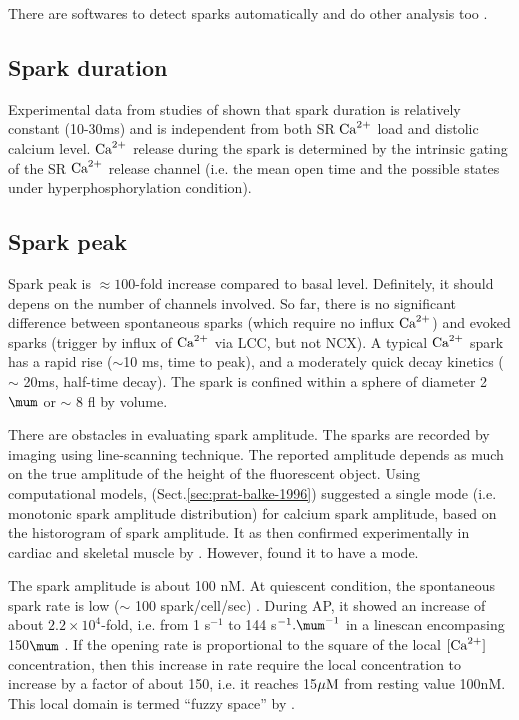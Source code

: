 There are softwares to detect sparks automatically and do other analysis too
\citep{picht2007}.

\subsection{Spark duration}

Experimental data from studies of \citep{cleeman1998,niggli1999} shown
that spark duration  is relatively constant (10-30ms) and is independent from both SR
${\text{Ca}^{2+}}$ load and distolic calcium level.
${\text{Ca}^{2+}}$ release during  the spark is determined by the intrinsic gating of the SR
${\text{Ca}^{2+}}$ release channel  (i.e. the mean open time and the possible states under
hyperphosphorylation condition). 

\subsection{Spark peak}

Spark peak is $\approx 100$-fold increase compared to basal
level\citep{santana1996}. Definitely, it should depens on the number of channels
involved. So far, there is no significant difference between spontaneous
sparks (which require no influx ${\text{Ca}^{2+}}$) and evoked sparks (trigger by influx of
${\text{Ca}^{2+}}$ via LCC, but not NCX). A typical ${\text{Ca}^{2+}}$ spark has a rapid rise ($\sim$10
ms, time to peak), and a moderately quick decay kinetics ($\sim$ 20ms, half-time
decay). The spark is confined within a sphere of diameter 2$\mum$ or $\sim$ 8 fl
by volume.

There are obstacles in evaluating spark amplitude. The sparks are recorded by
imaging using line-scanning technique. The reported amplitude depends as much on
the true amplitude of the height of the fluorescent object. Using computational
models, \citep{pratusevich1996} (Sect.\ref{sec:prat-balke-1996}) suggested a
single mode (i.e. monotonic spark amplitude distribution) for calcium spark
amplitude, based on the historogram of spark amplitude. It as then confirmed
experimentally in cardiac and skeletal muscle by \citep{cheng1999}. However,
\citep{bridge1999} found it to have a mode.

The spark amplitude is about 100 nM. At quiescent condition, the spontaneous
spark rate is low ($\sim$ 100 spark/cell/sec) \citep{cheng1993cse}. During AP,
it showed an increase of about $2.2\times 10^4$-fold, i.e. from 1 s$^{-1}$ to
144 s$^{-1}.\mum^{-1}$ in a linescan encompasing 150$\mum$
\citep{cannell1994snu}. If the opening rate is proportional to the square of the
local $[{\text{Ca}^{2+}}]$ concentration, then this increase in rate require the local
concentration to increase by a factor of about 150, i.e. it reaches 15${\mu\text{M}}$
from resting value 100nM. This local domain is termed ``fuzzy space'' by
\citep{niggli1990,lederer1990}.

